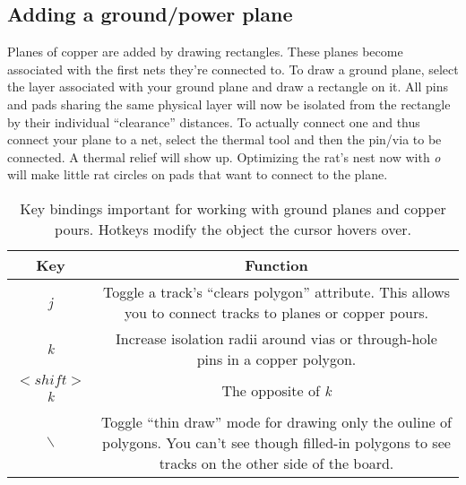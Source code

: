 \subsection{Adding a ground/power plane}
Planes of copper are added by drawing rectangles.  These planes become
associated with the first nets they're connected to.  To draw a ground
plane, select the layer associated with your ground plane and draw a
rectangle on it.  All pins and pads sharing the same physical layer
will now be isolated from the rectangle by their individual
``clearance'' distances.  To actually connect one and thus connect
your plane to a net, select the thermal tool and then the pin/via to
be connected.  A thermal relief will show up.  Optimizing the rat's
nest now with \textsl{o} will make little rat circles on pads that
want to connect to the plane.

\begin{table}[htb]
  \begin{center}
    \begin{tabular}{|c|c|}\hline
      Key	&Function \\ \hline \hline

      \textsl{j}	
      &\parbox[c][1.5\height][c]{5cm}{Toggle a track's ``clears polygon'' attribute.  This allows you to connect tracks to planes or copper pours.}\\ 
      \hline

      \textsl{k}
      &\parbox[c][1.5\height][c]{5cm}{Increase isolation radii around vias or through-hole pins in a copper polygon.}\\
      \hline

      $<shift>$\textsl{k}
      &\parbox[c][1.5\height][c]{5cm}{The opposite of \textsl{k}}\\
      \hline

      $\backslash$
      &\parbox[c][1.5\height][c]{5cm}{Toggle ``thin draw'' mode for drawing only the ouline of polygons.  You can't see though filled-in polygons to see tracks on the other side of the board.}\\
      \hline

    \end{tabular}
  \end{center}
  \caption{Key bindings important for working with ground planes and copper pours.  Hotkeys modify the object the cursor hovers over.\label{pour_table}}
\end{table}



